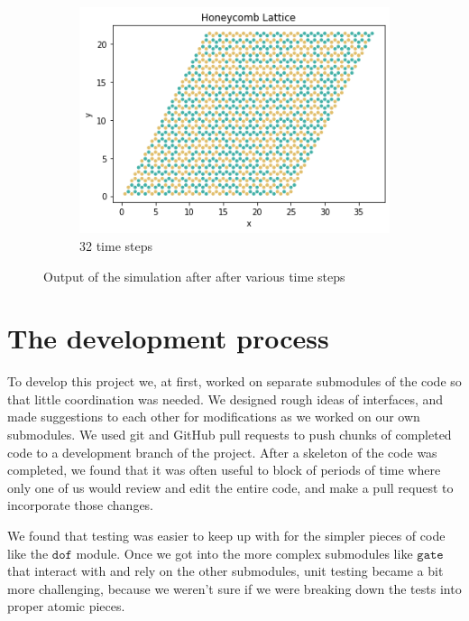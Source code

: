 \documentclass{article}
\begin{document}
\begin{figure}
\begin{subfigure}[b]{0.3\textwidth}
         \includegraphics[width=\textwidth]{step32.png}
         \caption{32 time steps}
         \label{fig:s32}
     \end{subfigure}
        \caption{Output of the simulation after after various time steps}
        \label{fig:output}
\end{figure}

\section{The development process}
To develop this project we, at first, worked on separate submodules of the code so that little coordination was needed. We designed rough ideas of interfaces, and made suggestions to each other for modifications as we worked on our own submodules. We used git and GitHub pull requests to push chunks of completed code to a development branch of the project. After a skeleton of the code was completed, we found that it was often useful to block of periods of time where only one of us would review and edit the entire code, and make a pull request to incorporate those changes.

We found that testing was easier to keep up with for the simpler pieces of code like the $\texttt{dof}$ module. Once we got into the more complex submodules like $\texttt{gate}$ that interact with and rely on the other submodules, unit testing became a bit more challenging, because we weren't sure if we were breaking down the tests into proper atomic pieces.
\end{document}
